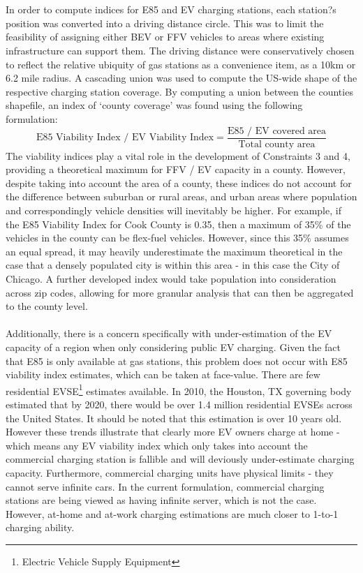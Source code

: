 \documentclass[answers]{exam}
\begin{document}
\\~\\
In order to compute indices for E85 and EV charging stations, each station?s position was converted into a driving distance circle. This was to limit the feasibility of assigning either BEV or FFV vehicles to areas where existing infrastructure can support them. The driving distance were conservatively chosen to reflect the relative ubiquity of gas stations as a convenience item, as a 10km or 6.2 mile radius. A cascading union was used to compute the US-wide shape of the respective charging station coverage. By computing a union between the counties shapefile, an index of `county coverage' was found using the following formulation:
$$\text{E85 Viability Index / EV Viability Index} = \frac{\text{E85 / EV covered area}}{\text{Total county area}}$$
The viability indices play a vital role in the development of Constraints 3 and 4, providing a theoretical maximum for FFV / EV capacity in a county. However, despite taking into account the area of a county, these indices do not account for the difference between suburban or rural areas, and urban areas where population and correspondingly vehicle densities will inevitably be higher. For example, if the E85 Viability Index for Cook County is 0.35, then a maximum of 35\% of the vehicles in the county can be flex-fuel vehicles. However, since this 35\% assumes an equal spread, it may heavily underestimate the maximum theoretical in the case that a densely populated city is within this area - in this case the City of Chicago. A further developed index would take population into consideration across zip codes, allowing for more granular analysis that can then be aggregated to the county level.
\\ ~\\ 
Additionally, there is a concern specifically with under-estimation of the EV capacity of a region when only considering public EV charging. Given the fact that E85 is only available at gas stations, this problem does not occur with E85 viability index estimates, which can be taken at face-value. There are few residential EVSE\footnote{Electric Vehicle Supply Equipment} estimates available. In 2010,  the Houston, TX governing body estimated that by 2020, there would be over 1.4 million residential EVSEs across the United States\cite{houston}. It should be noted that this estimation is over 10 years old. However these trends illustrate that clearly more EV owners charge at home - which means any EV viability index which only takes into account the commercial charging station is fallible and will deviously under-estimate charging capacity. Furthermore, commercial charging units have physical limits - they cannot serve infinite cars. In the current formulation, commercial charging stations are being viewed as having infinite server, which is not the case. However, at-home and at-work charging estimations are much closer to 1-to-1 charging ability.
\end{document}
